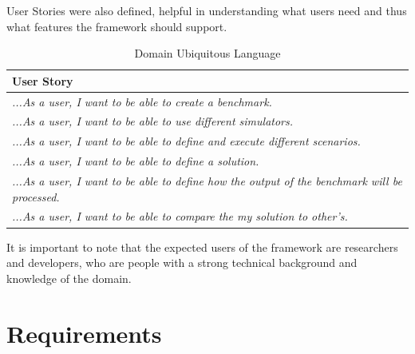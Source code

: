 \documentclass[12pt,a4paper,openright,twoside]{book}
\begin{document}
User Stories were also defined, helpful in understanding what users need and thus what features the framework should support.

\begin{table}[h]
  \centering
  \begin{tabular}{|p{}|}
    \toprule
    \textbf{User Story}                                                                                   \\
    \midrule
    \textit{...As a user, I want to be able to create a benchmark.}                                       \\ \hline
    \textit{...As a user, I want to be able to use different simulators.}                                 \\ \hline
    \textit{...As a user, I want to be able to define and execute different scenarios.}                   \\ \hline
    \textit{...As a user, I want to be able to define a solution.}                                        \\ \hline
    \textit{...As a user, I want to be able to define how the output of the benchmark will be processed.} \\ \hline
    \textit{...As a user, I want to be able to compare the my solution to other's.}                       \\ \hline
  \end{tabular}
  \caption{Domain Ubiquitous Language}
\end{table}

It is important to note that the expected users of the framework are researchers and developers,
who are people with a strong technical background and knowledge of the domain.

\section{Requirements}
\end{document}
